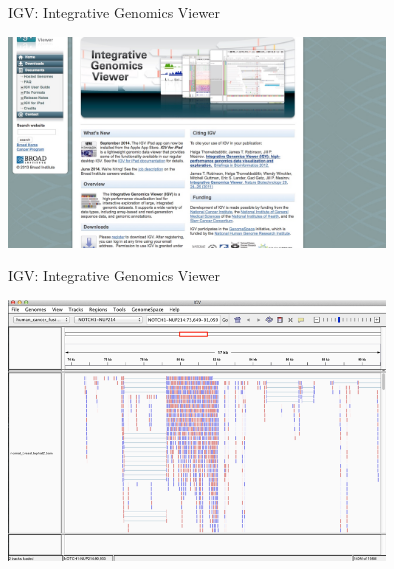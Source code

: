 \begin{frame}{IGV: Integrative Genomics Viewer}
\begin{center}
\includegraphics[width=10cm]{Images/IGV.jpg}
\end{center}
\end{frame}

\begin{frame}{IGV: Integrative Genomics Viewer}
\begin{center}
\includegraphics[width=10cm]{Images/IGValign.png}
\end{center}
\end{frame}
